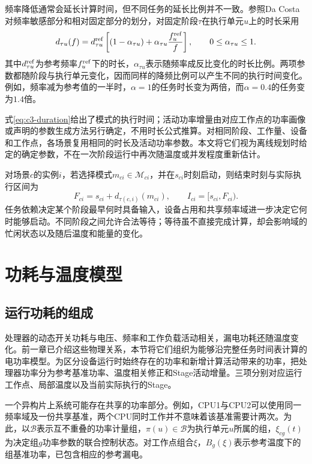 频率降低通常会延长计算时间，但不同任务的延长比例并不一致。参照Da Costa对频率敏感部分和相对固定部分的划分\cite{source2}，对固定阶段$\tau$在执行单元$u$上的时长采用
\begin{equation}
 d_{\tau u}(f)=d^{\rm ref}_{\tau u}
 \left[(1-\alpha_{\tau u})
       +\alpha_{\tau u}\frac{f_u^{\rm ref}}{f}\right],
 \qquad 0\le\alpha_{\tau u}\le1.
 \label{eq:c3-duration}
\end{equation}
其中$d^{\rm ref}_{\tau u}$为参考频率$f_u^{\rm ref}$下的时长，$\alpha_{\tau u}$表示随频率成反比变化的时长比例。两项参数都随阶段与执行单元变化，因而同样的降频比例可以产生不同的执行时间变化。例如，频率减为参考值的一半时，$\alpha=1$的任务时长变为两倍，而$\alpha=0.4$的任务变为$1.4$倍。

式\eqref{eq:c3-duration}给出了模式的执行时间；活动功率增量由对应工作点的功率画像或声明的参数生成方法另行确定，不用时长公式推算。对相同阶段、工作量、设备和工作点，各场景复用相同的时长及活动功率参数。本文将它们视为离线规划时给定的确定参数，不在一次阶段运行中再次随温度或并发程度重新估计。

对场景$c$的实例$i$，若选择模式$m_{ci}\in\mathcal M_{ci}$，并在$s_{ci}$时刻启动，则结束时刻与实际执行区间为
\begin{equation}
 F_{ci}=s_{ci}+d_{\tau(c,i)}(m_{ci}),\qquad
 I_{ci}=[s_{ci},F_{ci}).
 \label{eq:c3-stage-time}
\end{equation}
任务依赖决定某个阶段最早何时具备输入，设备占用和共享频率域进一步决定它何时能够启动。不同阶段之间允许合法等待；等待虽不直接完成计算，却会影响域的忙闲状态以及随后温度和能量的变化。

\section{功耗与温度模型}

\subsection{运行功耗的组成}

处理器的动态开关功耗与电压、频率和工作负载活动相关，漏电功耗还随温度变化。前一章已介绍这些物理关系，本节将它们组织为能够沿完整任务时间表计算的电功率模型。为区分设备运行时始终存在的功率和新增计算活动带来的功率，把处理器功率分为参考基准功率、温度相关修正和Stage活动增量。三项分别对应运行工作点、局部温度以及当前实际执行的Stage。

一个异构片上系统可能存在共享的功率部分。例如，CPU1与CPU2可以使用同一频率域及一份共享基准，两个CPU同时工作并不意味着该基准需要计两次。为此，以$\mathcal B$表示互不重叠的功率计量组，$\pi(u)\in\mathcal B$为执行单元$u$所属的组，$\xi_{cg}(t)$为决定组$g$功率参数的联合控制状态。对工作点组合$\xi$，$B_g(\xi)$表示参考温度下的组基准功率，已包含相应的参考漏电。

